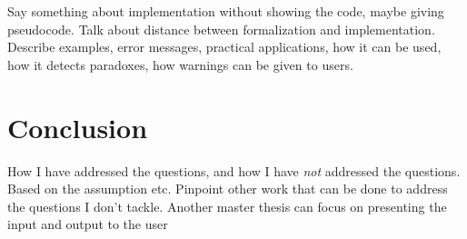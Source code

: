 \documentclass[a4paper,english]{ifimaster}
\begin{document}
Say something about implementation without showing the code, maybe giving pseudocode. Talk about distance between formalization and implementation. Describe examples, error messages, practical applications, how it can be used, how it detects paradoxes, how warnings can be given to users.


\part{Conclusion}
How I have addressed the questions, and how I have \emph{not} addressed the questions. Based on the assumption etc. Pinpoint other work that can be done to address the questions I don't tackle.
Another master thesis can focus on presenting the input and output to the user

\backmatter{}

\printbibliography
\end{document}

